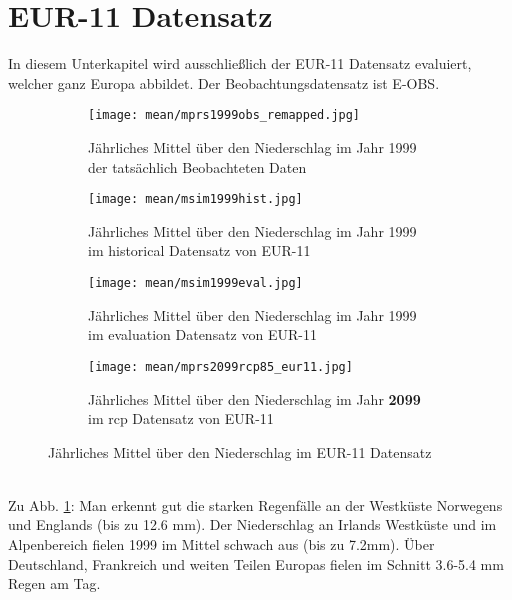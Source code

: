 \section{EUR-11 Datensatz}
In diesem Unterkapitel wird ausschließlich der EUR-11 Datensatz evaluiert, welcher ganz Europa abbildet. Der Beobachtungsdatensatz ist E-OBS\cite{eobs}.\\
\begin{figure}[hbt!]
	\begin{subfigure}{0.49\textwidth}
		\texttt{[image: mean/mprs1999obs\_remapped.jpg]}
		\caption{Jährliches Mittel über den Niederschlag im Jahr 1999 der tatsächlich Beobachteten Daten}
		\label{fig:mobs99}
	\end{subfigure}
	\begin{subfigure}{0.49\textwidth}
		\texttt{[image: mean/msim1999hist.jpg]}
		\caption{Jährliches Mittel über den Niederschlag im Jahr 1999 im historical Datensatz von EUR-11}
		\label{fig:mhist99}
	\end{subfigure}
	\begin{subfigure}{0.49\textwidth}
		\centering
		\texttt{[image: mean/msim1999eval.jpg]}
		\caption{Jährliches Mittel über den Niederschlag im Jahr 1999 im evaluation Datensatz von EUR-11}
		\label{fig:meval99}
	\end{subfigure}
	\begin{subfigure}{0.49\textwidth}
		\centering
		\texttt{[image: mean/mprs2099rcp85\_eur11.jpg]}
		\caption{Jährliches Mittel über den Niederschlag im Jahr \textbf{2099} im rcp Datensatz von EUR-11}
		\label{fig:mrcp99}
	\end{subfigure}
	\caption{Jährliches Mittel über den Niederschlag im EUR-11 Datensatz}
\end{figure}
\\
Zu Abb. \ref{fig:mobs99}: Man erkennt gut die starken Regenfälle an der Westküste Norwegens und Englands (bis zu 12.6 mm). Der Niederschlag an Irlands Westküste und im Alpenbereich fielen 1999 im Mittel schwach aus (bis zu 7.2mm). Über Deutschland, Frankreich und weiten Teilen Europas fielen im Schnitt 3.6-5.4 mm Regen am Tag.\\
\\
